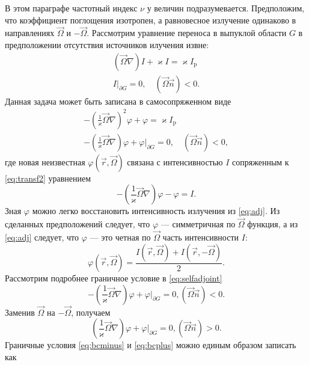 В этом параграфе частотный индекс $\nu$ у величин подразумевается. Предположим, что коэффициент поглощения изотропен, а равновесное излучение одинаково в направлениях $\vec \Omega$ и $-\vec \Omega$.
Рассмотрим уравнение переноса в выпуклой области $G$ в предположении отсутствия источников илучения извне:
\begin{equation}
\begin{gathered}
(\vec \Omega \nabla) I + \varkappa I = \varkappa I_\text{p}\\
I\big|_{\partial G} = 0, \quad (\vec \Omega \vec n) < 0.
\label{eq:transf2}
\end{gathered}
\end{equation}
Данная задача может быть записана в самосопряженном виде
\begin{equation}
\begin{gathered}
-\left(\frac{1}{\varkappa}\vec \Omega \nabla\right)^2 \varphi + \varphi = \varkappa I_\text{p}\\
-\left(\frac{1}{\varkappa}\vec \Omega \nabla\right)\varphi + \varphi \Big|_{\partial G} = 0, \quad (\vec \Omega \vec n) < 0,
\end{gathered}
\label{eq:selfadjoint} 
\end{equation}
где новая неизвестная $\varphi(\vec r, \vec \Omega)$ связана с интенсивностью $I$ сопряженным к \eqref{eq:transf2} уравнением
\begin{equation}
-\left(\frac{1}{\varkappa}\vec \Omega \nabla\right)\varphi - \varphi = I.
\label{eq:adj}
\end{equation}
Зная $\varphi$ можно легко восстановить интенсивность излучения из \eqref{eq:adj}. Из сделанных предположений следует, что $\varphi$ --- симметричная по $\vec \Omega$ функция, а из \eqref{eq:adj} следует, что $\varphi$ --- это четная по $\vec \Omega$ часть интенсивности $I$:
\[
\varphi(\vec r, \vec \Omega) = \frac{I(\vec r, \vec \Omega) + I(\vec r, -\vec \Omega)}{2}.
\]
Рассмотрим подробнее граничное условие в \eqref{eq:selfadjoint} 
\begin{equation}
-\left(\frac{1}{\varkappa}\vec \Omega\nabla\right)\varphi + \varphi\Big|_{\partial G} = 0, (\vec \Omega \vec n) < 0.
\label{eq:bcminus}
\end{equation}
Заменив $\vec \Omega$ на $-\vec \Omega$, получаем
\begin{equation}
\left(\frac{1}{\varkappa}\vec \Omega\nabla\right)\varphi + \varphi\Big|_{\partial G} = 0, (\vec \Omega \vec n) > 0.
\label{eq:bcplus}
\end{equation}
Граничные условия \eqref{eq:bcminus} и \eqref{eq:bcplus} можно единым образом записать как
